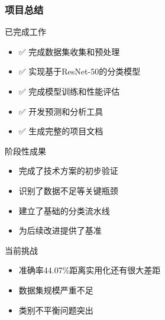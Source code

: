 \documentclass[12pt]{beamer}
\begin{document}
\begin{frame}
\frametitle{项目总结}
\begin{block}{已完成工作}
\begin{itemize}
    \item ✅ 完成数据集收集和预处理
    \item ✅ 实现基于ResNet-50的分类模型
    \item ✅ 完成模型训练和性能评估
    \item ✅ 开发预测和分析工具
    \item ✅ 生成完整的项目文档
\end{itemize}
\end{block}

\begin{block}{阶段性成果}
\begin{itemize}
    \item 完成了技术方案的初步验证
    \item 识别了数据不足等关键瓶颈
    \item 建立了基础的分类流水线
    \item 为后续改进提供了基准
\end{itemize}
\end{block}

\begin{alertblock}{当前挑战}
\begin{itemize}
    \item 准确率44.07\%距离实用化还有很大差距
    \item 数据集规模严重不足
    \item 类别不平衡问题突出
\end{itemize}
\end{alertblock}
\end{frame}
\end{document}
